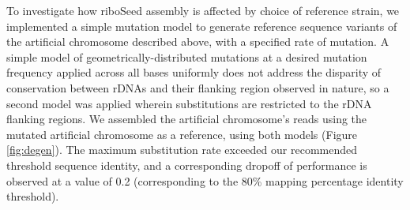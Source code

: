 To investigate how riboSeed assembly is affected by choice of reference strain, we implemented a simple mutation model to generate reference sequence variants of the artificial chromosome described above, with a specified rate of mutation. A simple model of geometrically-distributed mutations at a desired mutation frequency applied across all bases uniformly does not address the disparity of conservation between rDNAs and their flanking region observed in nature, so a second model was applied wherein substitutions are restricted to the rDNA flanking regions. We assembled the artificial chromosome's reads using the mutated artificial chromosome as a reference, using both models (Figure \ref{fig:degen}). The maximum substitution rate exceeded our recommended threshold sequence identity, and a corresponding dropoff of performance is observed at a value of 0.2 (corresponding to the 80\% mapping percentage identity threshold).
